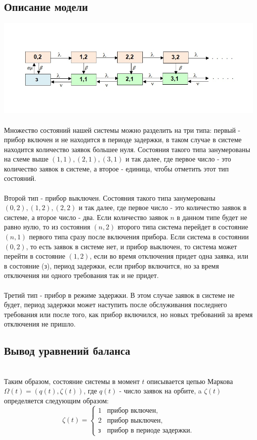 \documentclass[12pt]{article}
\begin{document}
\subsection{Описание модели}
\includegraphics[width=\textwidth]{syst}\\
\\Множество состояний нашей системы можно разделить на три типа: первый - прибор включен и не находится в периоде задержки, в таком случае в системе находится количество заявок большее нуля. Состояния такого типа занумерованы на схеме выше $(1,1), (2,1), (3,1)$ и так далее, где первое число - это количество заявок в системе, а второе - единица, чтобы отметить этот тип состояний. \\
\\Второй тип - прибор выключен. Состояния такого типа занумерованы $(0,2), (1,2), (2, 2)$ и так далее, где первое число - это количество заявок в системе, а второе число - два. Если количество заявок $n$ в данном типе будет не равно нулю, то из состояния $(n, 2)$ второго типа система перейдет в состояние $(n, 1)$ первого типа сразу после включения прибора. Если система в состоянии $(0,2)$, то есть заявок в системе нет, и прибор выключен, то система может перейти в состояние $(1,2)$, если во время отключения придет одна заявка, или в состояние (з), период задержки, если прибор включится, но за время отключения ни одного требования так и не придет. \\
\\
Третий тип - прибор в режиме задержки. В этом случае заявок в системе не будет, период задержки может наступить после обслуживания последнего требования или после того, как прибор включился, но новых требований за время отключения не пришло. 
\\

\subsection{Вывод уравнений баланса}\\
Таким образом, состояние системы в момент $t$ описывается цепью Маркова $\Omega(t) = (q(t), \zeta(t))$, где $q(t)$ - число заявок на орбите, a $\zeta(t)$ определяется следующим образом: \\
\begin{equation*}
\zeta(t) =
\begin{cases}
1 &\text{прибор включен,}\\
2 &\text{прибор выключен,}\\
\text{з} &\text{прибор в периоде задержки.}
\end{cases}
\end{equation*}
\end{document}
